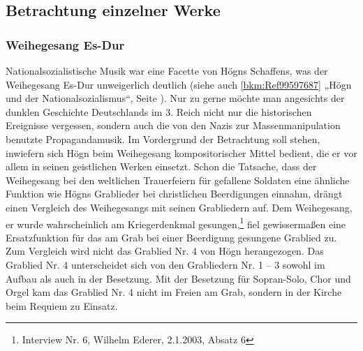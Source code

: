 \documentclass[a4paper]{article}
\begin{document}
\clearpage\subsection{Betrachtung einzelner Werke}
\hypertarget{RefHeadingToc100333752}{}\subsubsection{Weihegesang Es-Dur}
\label{bkm:Ref100062450}\hypertarget{RefHeadingToc100333753}{}\label{bkm:Ref100062461}\label{bkm:Ref100062456}Nationalsozialistische
Musik war eine Facette von Högns Schaffens, was der Weihegesang Es-Dur
unweigerlich deutlich (siehe auch \ref{bkm:Ref99597687} „Högn und der
Nationalsozialismus“, Seite \pageref{bkm:Ref99597697}). Nur zu gerne
möchte man angesichts der dunklen Geschichte Deutschlands im 3. Reich
nicht nur die historischen Ereignisse vergessen, sondern auch die von
den Nazis zur Massenmanipulation benutzte Propagandamusik. Im
Vordergrund der Betrachtung soll stehen, inwiefern sich Högn beim
Weihegesang kompositorischer Mittel bedient, die er vor allem in seinen
geistlichen Werken einsetzt. Schon die Tatsache, dass der Weihegesang
bei den weltlichen Trauerfeiern für gefallene Soldaten eine ähnliche
Funktion wie Högns Grablieder bei christlichen Beerdigungen einnahm,
drängt einen Vergleich des Weihegesangs mit seinen Grabliedern auf. Dem
Weihegesang, er wurde wahrscheinlich am Kriegerdenkmal
gesungen,\footnote{ Interview Nr. 6, Wilhelm Ederer, 2.1.2003, Absatz
6} fiel gewissermaßen eine Ersatzfunktion für das am Grab bei einer
Beerdigung gesungene Grablied zu. Zum Vergleich wird nicht das Grablied
Nr. 4 von Högn herangezogen. Das Grablied Nr. 4 unterscheidet sich von
den Grabliedern Nr. 1 – 3 sowohl im Aufbau als auch in der Besetzung.
Mit der Besetzung für Sopran-Solo, Chor und Orgel kam das Grablied Nr.
4 nicht im Freien am Grab, sondern in der Kirche beim Requiem zu
Einsatz. 
\end{document}
